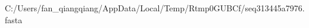 \documentclass[10pt]{article}
\begin{document}
\begin{texshade}{C:/Users/fan_qiangqiang/AppData/Local/Temp/Rtmp0GUBCf/seq313445a7976.fasta}
\hidelogoscale
{}
\end{texshade}
\end{document}
